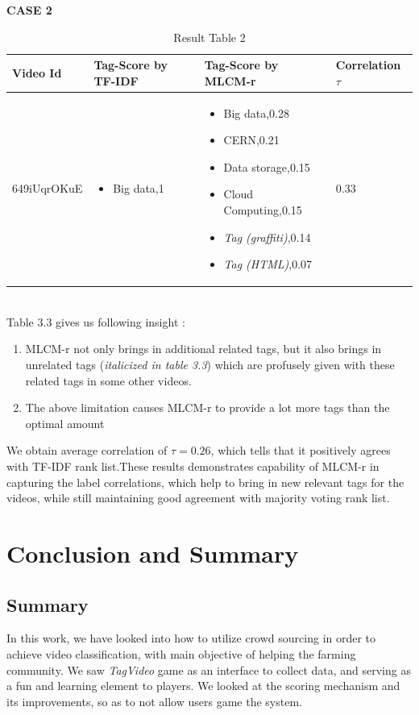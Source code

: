 \documentclass[12pt]{report}
\begin{document}
\textbf{CASE 2}\\
\begin{table}[htbp]\caption{Result Table 2}
\begin{center}%
\begin{tabular}{p{3cm} | p{5cm} | p{5.2cm} | p{3cm}}
\toprule
Video Id & Tag-Score by TF-IDF & Tag-Score by MLCM-r & Correlation $\tau$\\
\hline
649iUqrOKuE & 
\begin{itemize}
\item Big data,1
\end{itemize} & 
\begin{itemize}
\item Big data,0.28 
\item CERN,0.21
\item Data storage,0.15
\item Cloud Computing,0.15
\item \emph{Tag (graffiti)},0.14
\item \emph{Tag (HTML)},0.07 
\end{itemize} & 0.33\\
\bottomrule
\end{tabular}
\end{center}
\label{tab:ResultTable1}
\end{table}
\vspace{1em}\\
Table 3.3 gives us following insight :
\begin{enumerate}
\item MLCM-r not only brings in additional related tags, but it also brings in unrelated tags (\emph{italicized in table 3.3}) which are profusely given with these related tags in some other videos.
\item The above limitation causes MLCM-r to provide a lot more tags than the optimal amount
\end{enumerate}
We obtain average correlation of $\tau=0.26$, which tells that it positively agrees with TF-IDF rank list.These results demonstrates capability of MLCM-r in capturing the label correlations, which help to bring in new relevant tags for the videos, while still maintaining good agreement with majority voting rank list.
\chapter{Conclusion and Summary}
\section{Summary}
In this work, we have looked into how to utilize crowd sourcing in order to achieve video classification, with main objective of helping the farming community. We saw \emph{TagVideo} game as an interface to collect data, and serving as a fun and learning element to players. We looked at the scoring mechanism and its improvements, so as to not allow users game the system.
\end{document}
